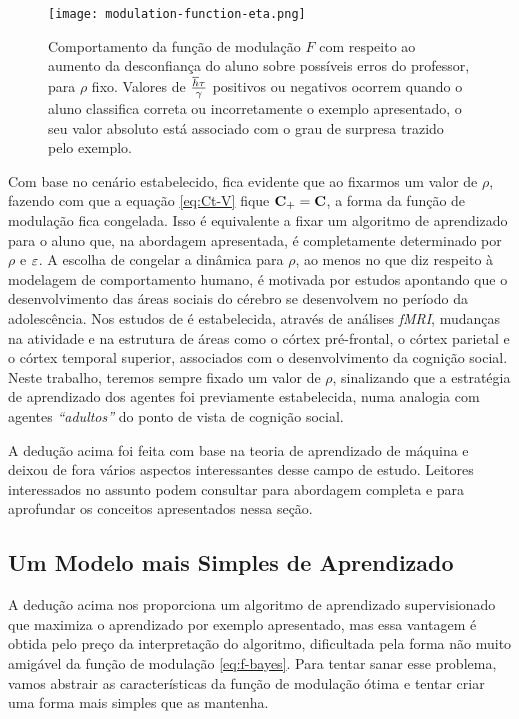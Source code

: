 \begin{figure*}[h!]\label{fig:Fns}
  \centering \texttt{[image: modulation-function-eta.png]}
  \caption{Comportamento da função de modulação $F$ com respeito ao aumento da desconfiança do aluno sobre possíveis erros do professor, para $\rho$ fixo. Valores de $\frac{\overline{h}\tau}{\gamma}$ positivos ou negativos ocorrem quando o aluno classifica correta ou incorretamente o exemplo apresentado, o seu valor absoluto está associado com o grau de surpresa trazido pelo exemplo.}
\end{figure*}

Com base no cenário estabelecido, fica evidente que ao fixarmos um valor de $\rho$, fazendo com que a equação \eqref{eq:Ct-V} fique $\mathbf{C}_+ = \mathbf{C}$, a forma da função de modulação fica congelada.
Isso  é equivalente a fixar um algoritmo de aprendizado para o aluno que, na abordagem apresentada, é completamente determinado por $\rho$ e $\varepsilon$.
A escolha de congelar a dinâmica para $\rho$, ao menos no que diz respeito à modelagem de comportamento humano, é motivada por estudos apontando que o desenvolvimento das áreas sociais do cérebro se desenvolvem no período da adolescência.
Nos estudos de \parencite{Choudhury2006, Blakemore2008,Moriguchi2007} é estabelecida, através de análises \emph{fMRI}, mudanças na atividade e na estrutura de áreas como o córtex pré-frontal, o córtex parietal e o córtex temporal superior, associados com o desenvolvimento da cognição social.
Neste trabalho, teremos sempre fixado um valor de $\rho$, sinalizando que a estratégia de aprendizado dos agentes foi previamente estabelecida, numa analogia com agentes \emph{``adultos''} do ponto de vista de cognição social.

A dedução acima foi feita com base na teoria de aprendizado de máquina e deixou de fora vários aspectos interessantes desse campo de estudo.
Leitores interessados no assunto podem consultar \parencite{Engel2001, Hastie1993} para abordagem completa e \parencite{Kinouchi1996, Solla1999,Opper1996} para aprofundar os conceitos apresentados nessa seção.

\subsection{Um Modelo mais Simples de Aprendizado}
\label{ssec:SLM}

A dedução acima nos proporciona um algoritmo de aprendizado supervisionado que maximiza o aprendizado por exemplo apresentado, mas essa vantagem é obtida pelo preço da interpretação do algoritmo, dificultada pela forma não muito amigável da função de modulação \eqref{eq:f-bayes}.
Para tentar sanar esse problema, vamos abstrair as características da função de modulação ótima e tentar criar uma forma mais simples que as mantenha.

